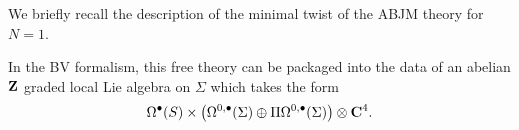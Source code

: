 \parsec

We briefly recall the description of the minimal twist of the ABJM theory for $N=1$.


In the BV formalism, this free theory can be packaged into the data of an abelian $\mathbf{Z}$ graded local Lie algebra on $\Sigma$ which takes the form
\[
\Omega^{\bullet}(S)\times \left (\Omega^{0,\bullet}(\Sigma) \oplus \Pi \Omega^{0,\bullet} (\Sigma )\right ) \otimes \mathbf{C}^{4}.
\]




%
%
%
%
%
%
%
